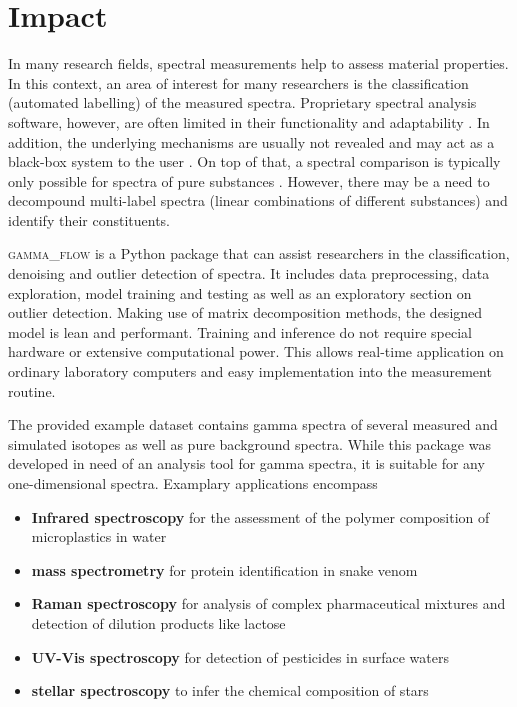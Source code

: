\documentclass[preprint, 12pt, a4paper]{elsarticle}
\begin{document}
\section{Impact}
In many research fields, spectral measurements help to assess material properties. 
In this context, an area of interest for many researchers is the classification (automated labelling) of the measured spectra. Proprietary spectral analysis software, however, are often limited in their functionality and adaptability \cite{Lam2011, Nasereddin2023}. In addition, the underlying mechanisms are usually not revealed and may act as a black-box system to the user \cite{ElAmri2022}. On top of that, a spectral comparison is typically only possible for spectra of pure substances \cite{Cowger2021}. However, there may be a need to decompound multi-label spectra (linear combinations of different substances) and identify their constituents. 

\textsc{gamma\_flow} is a Python package that can assist researchers in the classification, denoising and outlier detection of spectra. It includes data preprocessing, data exploration, model training and testing as well as an exploratory section on outlier detection. Making use of matrix decomposition methods, the designed model is lean and performant. Training and inference do not require special hardware or extensive computational power. This allows real-time application on ordinary laboratory computers and easy implementation into the measurement routine. 

The provided example dataset contains gamma spectra of several measured and simulated isotopes as well as pure background spectra. While this package was developed in need of an analysis tool for gamma spectra, it is suitable for any one-dimensional spectra. Examplary applications encompass  
\begin{itemize}
\item \textbf{Infrared spectroscopy} for the assessment of the polymer composition of 
microplastics in water \cite{Ferreiro2023, Whiting2022}  
\item \textbf{mass spectrometry} for protein identification in snake venom 
\cite{Zelanis2019, Yasemin2021}  
\item \textbf{Raman spectroscopy} for analysis of complex pharmaceutical mixtures and detection
of dilution products like lactose \cite{Fu2021}  
\item \textbf{UV-Vis spectroscopy} for detection of pesticides in surface waters \cite{Guo2020, Qi2024}
\item \textbf{stellar spectroscopy} to infer the chemical composition of stars \cite{Gray2021}  
\end{itemize}
\end{document}
